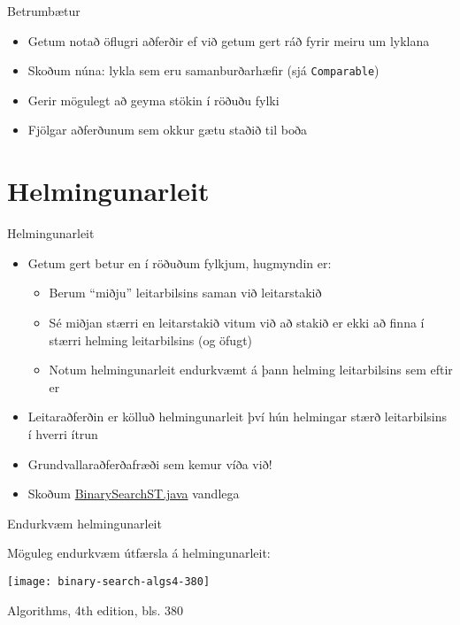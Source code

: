 \documentclass{beamer}
\begin{document}
\begin{frame}{Betrumbætur}
	\begin{itemize}
		\item Getum notað öflugri aðferðir ef við getum gert ráð fyrir meiru um lyklana
		\item Skoðum núna: lykla sem eru samanburðarhæfir (sjá \texttt{Comparable})
		\item Gerir mögulegt að geyma stökin í röðuðu fylki
		\item Fjölgar aðferðunum sem okkur gætu staðið til boða
	\end{itemize}
\end{frame}


\section{Helmingunarleit}

\begin{frame}{Helmingunarleit}
	\begin{itemize}
		\item Getum gert betur en  í röðuðum fylkjum, hugmyndin er:
		      \begin{itemize}
			      \item Berum ``miðju'' leitarbilsins saman við leitarstakið
			      \item Sé miðjan stærri en leitarstakið vitum við að stakið er ekki að finna í stærri helming leitarbilsins (og öfugt)
			      \item Notum helmingunarleit endurkvæmt á þann helming leitarbilsins sem eftir er
		      \end{itemize}
		\item Leitaraðferðin er kölluð helmingunarleit  því hún helmingar stærð leitarbilsins í hverri ítrun
		\item Grundvallaraðferðafræði sem kemur víða við!
		\item Skoðum \href{http://algs4.cs.princeton.edu/code/edu/princeton/cs/algs4/BinarySearchST.java.html}{BinarySearchST.java} vandlega
	\end{itemize}
\end{frame}

\begin{frame}{Endurkvæm helmingunarleit}
	\begin{center}
		Möguleg endurkvæm útfærsla á helmingunarleit:

		\texttt{[image: binary-search-algs4-380]}
	\end{center}
	Algorithms, 4th edition, bls. 380
\end{frame}
\end{document}
